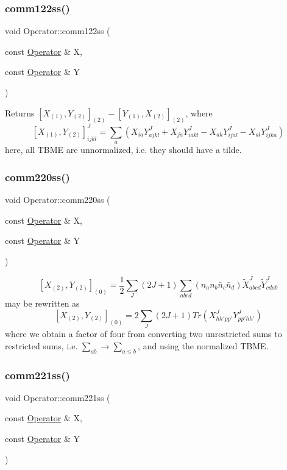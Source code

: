 \subsubsection{\texorpdfstring{comm122ss()}{comm122ss()}}
{\footnotesize\ttfamily void Operator\+::comm122ss (\begin{DoxyParamCaption}\item[{const \hyperlink{classOperator}{Operator} \&}]{X,  }\item[{const \hyperlink{classOperator}{Operator} \&}]{Y }\end{DoxyParamCaption})}

Returns $ [X_{(1)},Y_{(2)}]_{(2)} - [Y_{(1)},X_{(2)}]_{(2)} $, where \[ [X_{(1)},Y_{(2)}]^{J}_{ijkl} = \sum_{a} ( X_{ia}Y^{J}_{ajkl} + X_{ja}Y^{J}_{iakl} - X_{ak} Y^{J}_{ijal} - X_{al} Y^{J}_{ijka} ) \] here, all T\+B\+ME are unnormalized, i.\+e. they should have a tilde. \mbox{\label{classOperator_a8ea2254b8012c53ff6063a90ab7a5796}} 
\subsubsection{\texorpdfstring{comm220ss()}{comm220ss()}}
{\footnotesize\ttfamily void Operator\+::comm220ss (\begin{DoxyParamCaption}\item[{const \hyperlink{classOperator}{Operator} \&}]{X,  }\item[{const \hyperlink{classOperator}{Operator} \&}]{Y }\end{DoxyParamCaption})}

\[ [X_{(2)},Y_{(2)}]_{(0)} = \frac{1}{2} \sum_{J} (2J+1) \sum_{abcd} (n_a n_b \bar{n}_c \bar{n}_d) \tilde{X}_{abcd}^{J} \tilde{Y}_{cdab}^{J} \] may be rewritten as \[ [X_{(2)},Y_{(2)}]_{(0)} = 2 \sum_{J} (2J+1) Tr(X_{hh'pp'}^{J} Y_{pp'hh'}^{J}) \] where we obtain a factor of four from converting two unrestricted sums to restricted sums, i.\+e. $\sum_{ab} \rightarrow \sum_{a\leq b} $, and using the normalized T\+B\+ME. \mbox{\label{classOperator_abd2096925a9b0028ee988255955b907f}} 
\subsubsection{\texorpdfstring{comm221ss()}{comm221ss()}}
{\footnotesize\ttfamily void Operator\+::comm221ss (\begin{DoxyParamCaption}\item[{const \hyperlink{classOperator}{Operator} \&}]{X,  }\item[{const \hyperlink{classOperator}{Operator} \&}]{Y }\end{DoxyParamCaption})}

